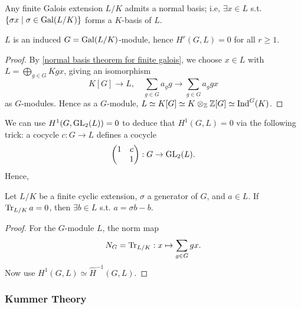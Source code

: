\begin{theorem}\label{normal basis theorem for finite galois}
    Any finite Galois extension $L/K$ admits a normal basis; i.e, $\exists x\in L$ s.t. $\{\sigma x\mid \sigma\in\operatorname{Gal}(L/K)\}$ forms a $K$-basis of $L$.
\end{theorem}


\begin{proposition}
    $L$ is an induced $G = \operatorname{Gal}(L/K)$-module, hence
    $H^r(G, L) = 0$ for all $r \ge 1$.
\end{proposition}
\begin{proof}
    By \cref{normal basis theorem for finite galois},
    we choose $x\in L$ with $L = \bigoplus_{g\in G} Kgx$, giving an isomorphism \[K[G]\to L,\quad \sum_{g\in G}a_gg\to\sum_{g\in G}a_ggx\]
    as $G$-modules. Hence as a $G$-module,
    $L\simeq K[G]\simeq K\otimes_{\mathbb{Z}} \mathbb{Z}[G]\simeq\operatorname{Ind}^G(K)$.
\end{proof}
\begin{remark}
    We can use $H^1(G, \operatorname{GL}_2(L)) = 0$ to deduce that $H^1(G, L) = 0$ via the following trick:
    a cocycle $c : G\to L$ defines a cocycle \[\begin{pmatrix}
        1 & c \\ & 1
    \end{pmatrix} : G\to\operatorname{GL}_2(L).\]
    Hence, 
\end{remark}

\begin{corollary}\label{Hilbert 90 - additive}
    Let $L/K$ be a finite cyclic extension, $\sigma$ a generator of $G$, and $a\in L$.
    If $\operatorname{Tr}_{L/K}a = 0$,
    then $\exists b\in L$ s.t. $a = \sigma b - b$.
\end{corollary}
\begin{proof}
    For the $G$-module $L$, the norm map \[N_G = \operatorname{Tr}_{L/K} : x\mapsto \sum_{g\in G}gx.\]
    Now use $H^{1}(G, L) \simeq \hat H^{-1}(G, L)$.
\end{proof}

\subsubsection{Kummer Theory}
